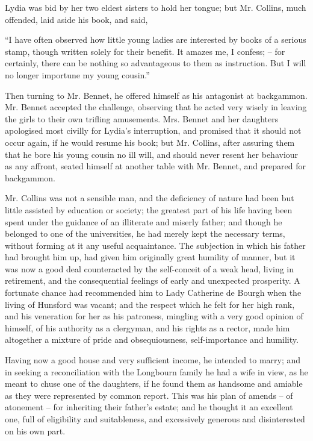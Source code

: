 Lydia was bid by her two eldest sisters to hold her
tongue; but Mr. Collins, much offended, laid aside his
book, and said,

“I have often observed how little young ladies are
interested by books of a serious stamp, though written
solely for their benefit. It amazes me, I confess; -- for
certainly, there can be nothing so advantageous to them
as instruction. But I will no longer importune my young
cousin.”

Then turning to Mr. Bennet, he offered himself as his
antagonist at backgammon. Mr. Bennet accepted the
challenge, observing that he acted very wisely in leaving
the girls to their own trifling amusements. Mrs. Bennet
and her daughters apologised most civilly for Lydia’s
interruption, and promised that it should not occur again,
if he would resume his book; but Mr. Collins, after
assuring them that he bore his young cousin no ill will,
and should never resent her behaviour as any affront,
seated himself at another table with Mr. Bennet, and
prepared for backgammon.


Mr. Collins was not a sensible man, and the deficiency
of nature had been but little assisted by education or
society; the greatest part of his life having been spent
under the guidance of an illiterate and miserly father;
and though he belonged to one of the universities, he had
merely kept the necessary terms, without forming at it
any useful acquaintance. The subjection in which his
father had brought him up, had given him originally great
humility of manner, but it was now a good deal counteracted
by the self-conceit of a weak head, living in retirement,
and the consequential feelings of early and unexpected
prosperity. A fortunate chance had recommended
him to Lady Catherine de Bourgh when the living of
Hunsford was vacant; and the respect which he felt for
her high rank, and his veneration for her as his patroness,
mingling with a very good opinion of himself, of his
authority as a clergyman, and his rights as a rector, made
him altogether a mixture of pride and obsequiousness,
self-importance and humility.

Having now a good house and very sufficient income,
he intended to marry; and in seeking a reconciliation
with the Longbourn family he had a wife in view, as he
meant to chuse one of the daughters, if he found them
as handsome and amiable as they were represented by
common report. This was his plan of amends -- of atonement -- for
inheriting their father’s estate; and he thought
it an excellent one, full of eligibility and suitableness,
and excessively generous and disinterested on his own
part.

